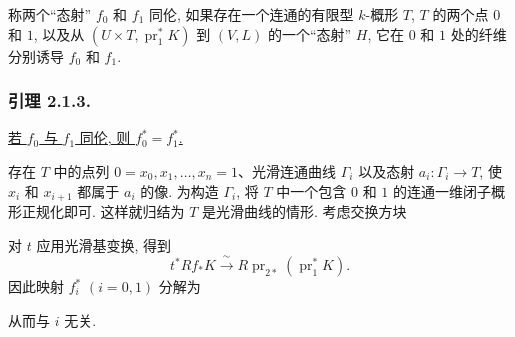 称两个“态射” $f_0$ 和 $f_1$ 同伦, 如果存在一个连通的有限型 $k$-概形 $T$, $T$ 的两个点 $0$ 和 $1$, 以及从 $(U\times T,\operatorname{pr}_1^*K)$ 到 $(V,L)$ 的一个“态射” $H$, 它在 $0$ 和 $1$ 处的纤维分别诱导 $f_0$ 和 $f_1$.

\subsubsection*{引理 2.1.3.}
\underline{若 $f_0$ 与 $f_1$ 同伦, 则 $f_0^*=f_1^*$.}

存在 $T$ 中的点列 $0=x_0,x_1,\ldots,x_n=1$、光滑连通曲线 $\Gamma_i$ 以及态射 $a_i:\Gamma_i\to T$, 使 $x_i$ 和 $x_{i+1}$ 都属于 $a_i$ 的像. 为构造 $\Gamma_i$, 将 $T$ 中一个包含 $0$ 和 $1$ 的连通一维闭子概形正规化即可. 这样就归结为 $T$ 是光滑曲线的情形. 考虑交换方块
\begin{center}
\end{center}
对 $t$ 应用光滑基变换, 得到
\[
t^*Rf_*K\xrightarrow{\ \sim\ }
R\operatorname{pr}_{2*}(\operatorname{pr}_1^*K).
\]
因此映射 $f_i^*$ $(i=0,1)$ 分解为
\begin{center}
\end{center}
从而与 $i$ 无关.